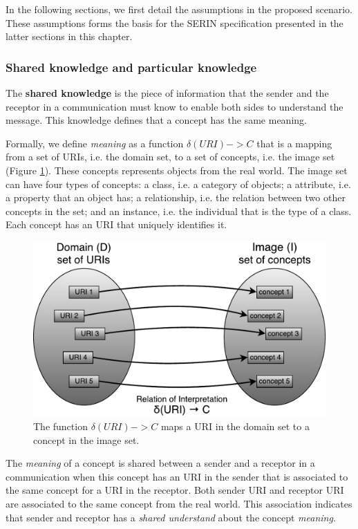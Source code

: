 \documentclass{singlecol-new}
\theoremstyle{TH}{
\newtheorem{lemma}{Lemma}
\newtheorem{theorem}[lemma]{Theorem}
\newtheorem{corrolary}[lemma]{Corrolary}
\newtheorem{conjecture}[lemma]{Conjecture}
\newtheorem{proposition}[lemma]{Proposition}
\newtheorem{claim}[lemma]{Claim}
\newtheorem{stheorem}[lemma]{Wrong Theorem}
\newtheorem{algorithm}{Algorithm}
}
\theoremstyle{THrm}{
\newtheorem{definition}{Definition}[section]
\newtheorem{question}{Question}[section]
\newtheorem{remark}{Remark}
\newtheorem{scheme}{Scheme}
}
\theoremstyle{THhit}{
\newtheorem{case}{Case}[section]
}
\begin{document}
In the following sections, we first detail the assumptions in the proposed scenario. These assumptions forms the basis for the SERIN specification presented in the latter sections in this chapter. 

\subsubsection{Shared knowledge and particular knowledge}
\label{sec:sharedknowl}
The \textbf{shared knowledge} is the piece of information that the sender and the receptor in a  communication must know to enable both sides to understand the message. 
This knowledge defines that a concept has the same meaning.

Formally, we define \textit{meaning} as a function $\delta(URI) -> C$ that is a mapping from a set of URIs, i.e. the domain set, to a set of concepts, i.e. the image set (Figure \ref{fig:functionmeaning}). 
These concepts represents objects from the real world. The image set can have four types of concepts: a class, i.e. a category of objects; a attribute, i.e. a property that an object has; a relationship, i.e. the relation between two other concepts in the set; and an instance, i.e. the individual that is the type of a class. 
Each concept has an URI that uniquely identifies it.

\begin{figure}[!b]
	\includegraphics[scale=.6]{images/conjunto-interpretacao-compartilhada.pdf}
	\centering
	\caption{The function $\delta(URI) -> C$ maps a URI in the domain set to a concept in the image set.}
	\label{fig:functionmeaning}
\end{figure}

The \textit{meaning} of a concept is shared between a sender and a receptor in a communication when this concept has an URI in the sender that is associated to the same concept for a URI in the receptor. Both sender URI and receptor URI are associated to the same concept from the real world.
This association indicates that sender and receptor has a \textit{shared understand} about the concept \textit{meaning}. 
\end{document}
